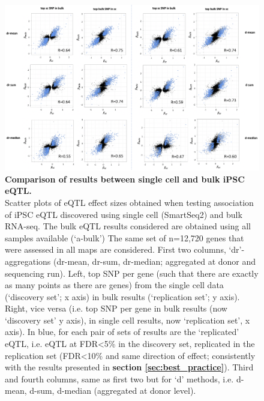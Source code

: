 \begin{figure}[h]
    \centering
    \includegraphics[width=16cm]{Appendix2/Fig/supplement_sc_vs_bulk.png}
    \caption[Comparison of results between single cell and bulk iPSC eQTL]{\textbf{Comparison of results between single cell and bulk iPSC eQTL.}\\
    Scatter plots of eQTL effect sizes obtained when testing association of iPSC eQTL discovered using single cell (SmartSeq2) and bulk RNA-seq.
    The bulk eQTL results considered are obtained using all samples available (`a-bulk')
    The same set of n=12,720 genes that were assessed in all maps are considered.
    First two columns, `dr'-aggregations (dr-mean, dr-sum, dr-median; aggregated at donor and sequencing run). 
    Left, top SNP per gene (such that there are exactly as many points as there are genes) from the single cell data (`discovery set'; x axis) in bulk results (`replication set'; y axis). 
    Right, vice versa (i.e. top SNP per gene in bulk results (now `discovery set' y axis), in single cell results, now `replication set', x axis).
    In blue, for each pair of sets of results are the `replicated' eQTL, i.e. eQTL at FDR<5\% in the discovery set, replicated in the replication set (FDR<10\% and same direction of effect; consistently with the results presented in \textbf{section \ref{sec:best_practice}}).
    Third and fourth columns, same as first two but for `d' methods, i.e. d-mean, d-sum, d-median (aggregated at donor level).}
    \label{suppl_fig:sc_vs_bulk}
\end{figure}

